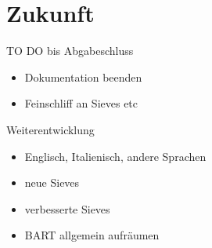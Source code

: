 \documentclass[11pt,a4paper]{beamer}
\begin{document}
\section{Zukunft}
\begin{frame}{TO DO bis Abgabeschluss}
\begin{itemize}
\item Dokumentation beenden
\item Feinschliff an Sieves etc
\end{itemize}
\end{frame}

\begin{frame}{Weiterentwicklung}
\begin{itemize}
\item Englisch, Italienisch, andere Sprachen
\item neue Sieves 
\item verbesserte Sieves
\item BART allgemein aufräumen
\end{itemize}
\end{frame}


%
%
\end{document}

